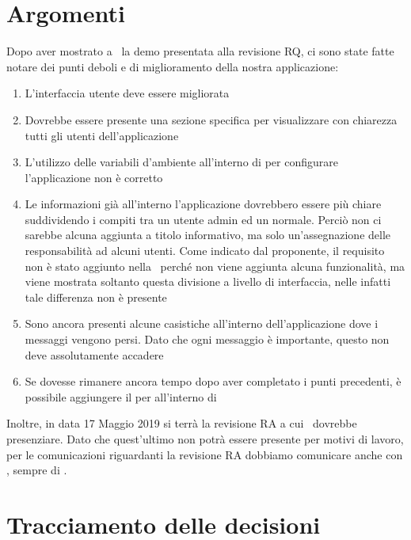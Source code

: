     \section{Argomenti}
    Dopo aver mostrato a \DZ~la demo presentata alla revisione RQ, ci sono state fatte notare dei punti deboli e di miglioramento della nostra applicazione:
    \begin{enumerate}
        \item L'interfaccia utente deve essere migliorata
        \item Dovrebbe essere presente una sezione specifica per visualizzare con chiarezza tutti gli utenti dell'applicazione
        \item L'utilizzo delle variabili d'ambiente all'interno di  per configurare l'applicazione non è corretto
        \item Le informazioni già all'interno l'applicazione dovrebbero essere più chiare suddividendo i compiti tra un utente admin ed un normale. Perciò non ci sarebbe alcuna aggiunta a titolo informativo, ma solo un'assegnazione delle responsabilità ad alcuni utenti. Come indicato dal proponente, il requisito non è stato aggiunto nella \AdRd\ perché non viene aggiunta alcuna funzionalità, ma viene mostrata soltanto questa divisione a livello di interfaccia, nelle  infatti tale differenza non è presente
        \item Sono ancora presenti alcune casistiche all'interno dell'applicazione dove i messaggi vengono persi. Dato che ogni messaggio è importante, questo non deve assolutamente accadere
        \item Se dovesse rimanere ancora tempo dopo aver completato i punti precedenti, è possibile aggiungere il  per  all'interno di \progetto
    \end{enumerate} 

    Inoltre, in data 17 Maggio 2019 si terrà la revisione RA a cui \DZ~dovrebbe presenziare. Dato che quest'ultimo non potrà essere presente per motivi di lavoro, per le comunicazioni riguardanti la revisione RA dobbiamo comunicare anche con \LuC, sempre di \II.

    \section{Tracciamento delle decisioni}

